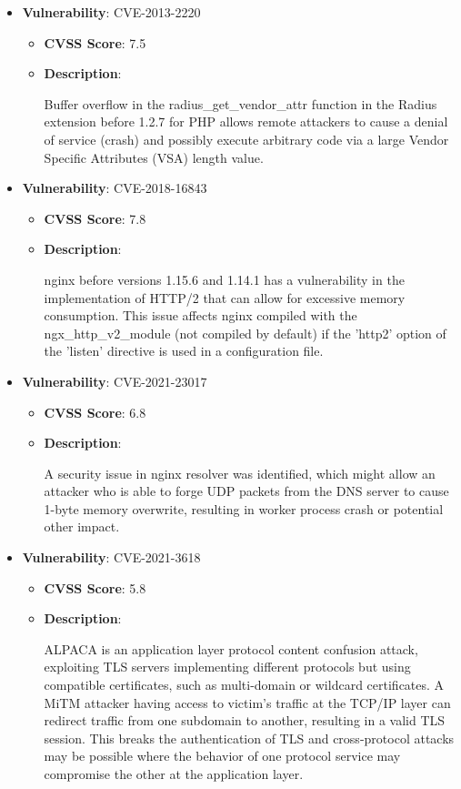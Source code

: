 \documentclass{article}
\begin{document}
\begin{itemize}
        \item \textbf{Vulnerability}: CVE-2013-2220
        \begin{itemize}
            \item \textbf{CVSS Score}:  7.5 
            \item \textbf{Description}:
            \parbox[t]{0.9\linewidth}{
                \ttfamily Buffer overflow in the radius\_get\_vendor\_attr function in the Radius extension before 1.2.7 for PHP allows remote attackers to cause a denial of service (crash) and possibly execute arbitrary code via a large Vendor Specific Attributes (VSA) length value.
            }
        \end{itemize}
    
        \item \textbf{Vulnerability}: CVE-2018-16843
        \begin{itemize}
            \item \textbf{CVSS Score}:  7.8 
            \item \textbf{Description}:
            \parbox[t]{0.9\linewidth}{
                \ttfamily nginx before versions 1.15.6 and 1.14.1 has a vulnerability in the implementation of HTTP/2 that can allow for excessive memory consumption. This issue affects nginx compiled with the ngx\_http\_v2\_module (not compiled by default) if the 'http2' option of the 'listen' directive is used in a configuration file.
            }
        \end{itemize}
    
        \item \textbf{Vulnerability}: CVE-2021-23017
        \begin{itemize}
            \item \textbf{CVSS Score}:  6.8 
            \item \textbf{Description}:
            \parbox[t]{0.9\linewidth}{
                \ttfamily A security issue in nginx resolver was identified, which might allow an attacker who is able to forge UDP packets from the DNS server to cause 1-byte memory overwrite, resulting in worker process crash or potential other impact.
            }
        \end{itemize}
    
        \item \textbf{Vulnerability}: CVE-2021-3618
        \begin{itemize}
            \item \textbf{CVSS Score}:  5.8 
            \item \textbf{Description}:
            \parbox[t]{0.9\linewidth}{
                \ttfamily ALPACA is an application layer protocol content confusion attack, exploiting TLS servers implementing different protocols but using compatible certificates, such as multi-domain or wildcard certificates. A MiTM attacker having access to victim's traffic at the TCP/IP layer can redirect traffic from one subdomain to another, resulting in a valid TLS session. This breaks the authentication of TLS and cross-protocol attacks may be possible where the behavior of one protocol service may compromise the other at the application layer.
            }
        \end{itemize}
    

\end{itemize}
\end{document}
